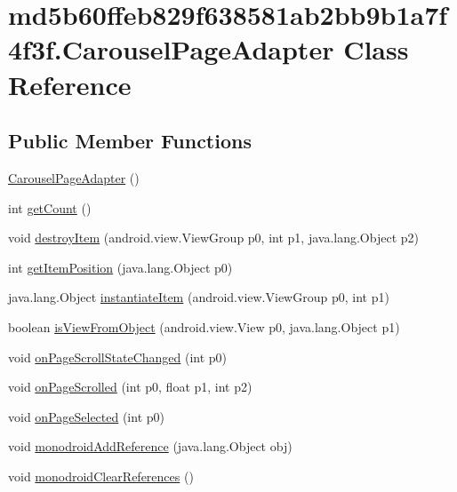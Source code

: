 \hypertarget{classmd5b60ffeb829f638581ab2bb9b1a7f4f3f_1_1_carousel_page_adapter}{
\section{md5b60ffeb829f638581ab2bb9b1a7f4f3f.CarouselPageAdapter Class Reference}
\label{classmd5b60ffeb829f638581ab2bb9b1a7f4f3f_1_1_carousel_page_adapter}
}
\subsection*{Public Member Functions}
\begin{CompactItemize}
\item 
\hyperlink{classmd5b60ffeb829f638581ab2bb9b1a7f4f3f_1_1_carousel_page_adapter_9f5b0766bf8480cc782853f50eed5713}{CarouselPageAdapter} ()
\item 
int \hyperlink{classmd5b60ffeb829f638581ab2bb9b1a7f4f3f_1_1_carousel_page_adapter_0e49bdba4f14c96d9de8981bdcd0654c}{getCount} ()
\item 
void \hyperlink{classmd5b60ffeb829f638581ab2bb9b1a7f4f3f_1_1_carousel_page_adapter_c769d6b98fd82eba086700268f65e1b0}{destroyItem} (android.view.ViewGroup p0, int p1, java.lang.Object p2)
\item 
int \hyperlink{classmd5b60ffeb829f638581ab2bb9b1a7f4f3f_1_1_carousel_page_adapter_3033cdd51c82c723fde4d8a68493d1a1}{getItemPosition} (java.lang.Object p0)
\item 
java.lang.Object \hyperlink{classmd5b60ffeb829f638581ab2bb9b1a7f4f3f_1_1_carousel_page_adapter_dc3ae71455cc6ba15871925d4a065505}{instantiateItem} (android.view.ViewGroup p0, int p1)
\item 
boolean \hyperlink{classmd5b60ffeb829f638581ab2bb9b1a7f4f3f_1_1_carousel_page_adapter_12525022977645735ade145e4b25585a}{isViewFromObject} (android.view.View p0, java.lang.Object p1)
\item 
void \hyperlink{classmd5b60ffeb829f638581ab2bb9b1a7f4f3f_1_1_carousel_page_adapter_c569e2268db74e1784f77688be58f5e4}{onPageScrollStateChanged} (int p0)
\item 
void \hyperlink{classmd5b60ffeb829f638581ab2bb9b1a7f4f3f_1_1_carousel_page_adapter_e15db51016113a498393c866a8158d15}{onPageScrolled} (int p0, float p1, int p2)
\item 
void \hyperlink{classmd5b60ffeb829f638581ab2bb9b1a7f4f3f_1_1_carousel_page_adapter_360c31146411f2e3fdcad01ef4242ef6}{onPageSelected} (int p0)
\item 
void \hyperlink{classmd5b60ffeb829f638581ab2bb9b1a7f4f3f_1_1_carousel_page_adapter_1f2a2b6fa20f43e6389b1ff39fbe3d49}{monodroidAddReference} (java.lang.Object obj)
\item 
void \hyperlink{classmd5b60ffeb829f638581ab2bb9b1a7f4f3f_1_1_carousel_page_adapter_486afd9cefaf3f8e0ff4a0c65745b9bc}{monodroidClearReferences} ()
\end{CompactItemize}
